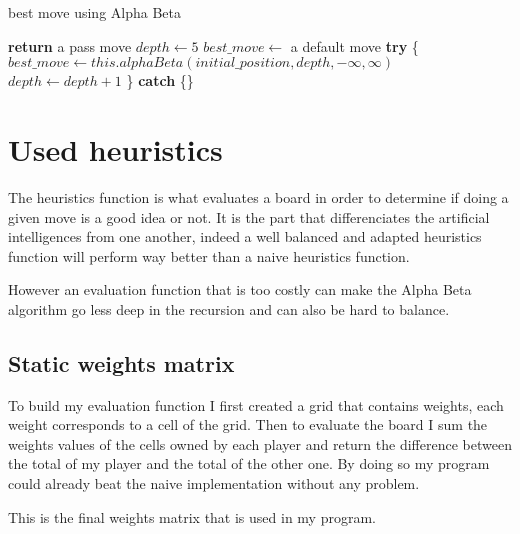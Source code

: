 \FloatBarrier
\begin{algorithm}
    \caption{best move using Alpha Beta}
    \begin{algorithmic}[1]
                \State \textbf{return} a pass move
            \EndIf
            \State $depth \gets 5$
            \State $best\_move \gets$ a default move
                \State \textbf{try} \{
                    \State $best\_move \gets this.alphaBeta(initial\_position, depth, -\infty, \infty)$
                    \State $depth \gets depth + 1$
                \State \} \textbf{catch} \{\}
            \EndWhile
        \EndProcedure
    \end{algorithmic}
\end{algorithm}
\FloatBarrier

\section{Used heuristics}

The heuristics function is what evaluates a board in order to determine if doing a given move is a good idea or not.
It is the part that differenciates the artificial intelligences from one another, indeed a well balanced and adapted heuristics function will perform way better than a naive heuristics function.

However an evaluation function that is too costly can make the Alpha Beta algorithm go less deep in the recursion and can also be hard to balance.

\subsection{Static weights matrix}

To build my evaluation function I first created a grid that contains weights, each weight corresponds to a cell of the grid.
Then to evaluate the board I sum the weights values of the cells owned by each player and return the difference between the total of my player and the total of the other one.
By doing so my program could already beat the naive implementation without any problem.

This is the final weights matrix that is used in my program.

